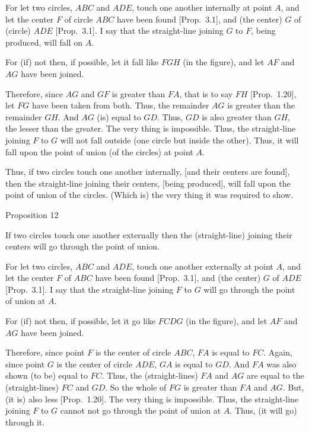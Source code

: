 For let two circles, $ABC$ and $ADE$, touch one another internally
at point $A$, and let the center $F$ of circle $ABC$ have been
found [Prop.~3.1], and (the center) $G$ of (circle) $ADE$ [Prop.~3.1].
I say that the straight-line joining $G$ to $F$, being produced, will fall on $A$.

For (if) not then, if possible, let it fall like $FGH$ (in the figure), and
let $AF$ and $AG$ have been joined.

Therefore, since $AG$ and $GF$ is greater than $FA$, that is to
say $FH$ [Prop.~1.20], let $FG$ have been taken from both.
Thus, the remainder $AG$ is greater than the remainder $GH$.
And $AG$ (is) equal to $GD$. Thus, $GD$ is also greater than $GH$, the lesser
than the greater. The very thing is impossible. Thus, the straight-line
joining $F$ to $G$ will not fall outside (one circle but inside the other). Thus, it will fall upon the point of
union (of the circles) at point $A$. 

\epsfysize=2.2in
\centerline{}

Thus, if two circles  touch one another internally, [and their
centers are found], then  the straight-line joining their
centers, [being produced], will fall upon the point of union of
the circles. (Which is) the very thing it was required to show.


\begin{center}
{\large Proposition 12}
\end{center}

If two circles touch one another externally then the (straight-line)
joining their centers will go through the point of union.

\epsfysize=2.5in
\centerline{}

For let two circles, $ABC$ and $ADE$, touch one another externally at point $A$,
and let the center $F$ of $ABC$ have been found [Prop.~3.1], and
(the center) $G$ of $ADE$ [Prop.~3.1]. I say that the straight-line joining
$F$ to $G$ will go through the point of union at $A$.

For (if) not then, if possible, let it go like $FCDG$ (in the figure), and let $AF$ and
$AG$ have been joined.

Therefore, since point $F$ is the center of circle $ABC$, $FA$ is equal to $FC$.
Again, since point $G$ is the center of circle $ADE$, $GA$ is equal to $GD$.
And $FA$ was also shown (to be)  equal to $FC$. Thus, the (straight-lines)
$FA$ and $AG$ are equal to the (straight-lines) $FC$ and $GD$. So the whole
of $FG$ is greater than $FA$ and $AG$. But, (it is) also less [Prop.~1.20].
The very thing is impossible. Thus, the straight-line joining $F$ to $G$
cannot not go through the point of union at $A$. Thus, (it will go) through it.

